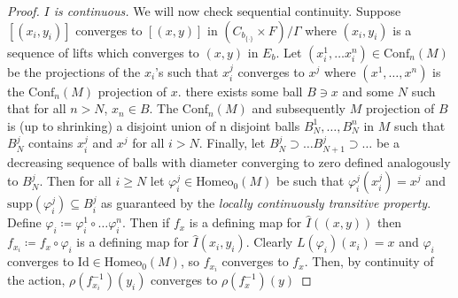 \documentclass[10pt, oneside]{article}
\newcommand{\homeo}[1][S^1]{\text{Homeo}_0(#1)}
\newcommand{\conf}[2][S^1]{\text{Conf}_{#2}(#1)}
\newcommand{\set}{{\{\cdot\}}}
\newcommand{\maxcov}{C_{b_\set}}
\theoremstyle{definition}
\theoremstyle{definition}
\begin{document}
\begin{proof}
    \medskip
    {\it $I$ is continuous.} We will now check sequential continuity. Suppose $[(x_i, y_i)]$ converges to $[(x, y)]$ in $(\maxcov\times F)/\Gamma$ where $(x_i, y_i)$ is a sequence of lifts which converges to $(x,y)$ in $E_b$. Let $(x_i^1,\dots x_i^n)\in\conf[M]{n}$ be the projections of the $x_i$'s such that $x_i^j$ converges to $x^j$ where $(x^1,\dots, x^n)$ is the $\conf[M]{n}$ projection of $x$. there exists some ball $B\ni x$ and some $N$ such that for all $n> N$, $x_n\in B$. The $\conf[M]{n}$ and subsequently $M$ projection of $B$ is (up to shrinking) a disjoint union of n disjoint balls $B_N^1,\dots,B_N^n$ in $M$ such that $B_N^j$ contains $x_i^j$ and $x^j$ for all $i>N$. Finally, let $B_N^j\supset\dots B_{N+1}^j\supset\dots$ be a decreasing sequence of balls with diameter converging to zero defined analogously to $B_N^j$. Then for all $i\geq N$ let $\varphi_i^j\in\homeo[M]$ be such that $\varphi_i^j(x_i^j)=x^j$ and $\text{supp}(\varphi_i^j)\subseteq B_i^j$ as guaranteed by the {\it locally continuously transitive property}. Define $\varphi_i \coloneqq \varphi^1_i\circ\dots\varphi^n_i$. Then if $f_x$ is a defining map for $\hat{I}((x, y))$ then $f_{x_i}\coloneqq f_x\circ\varphi_i$ is a defining map for $\hat{I}(x_i, y_i)$. Clearly $L(\varphi_i)(x_i) = x$ and $\varphi_i$ converges to $\text{Id}\in\homeo[M]$, so $f_{x_i}$ converges to $f_x$. Then, by continuity of the action, $\rho(f_{x_i}^{-1})(y_i)$ converges to $\rho(f_x^{-1})(y)$


\end{proof}
\end{document}
